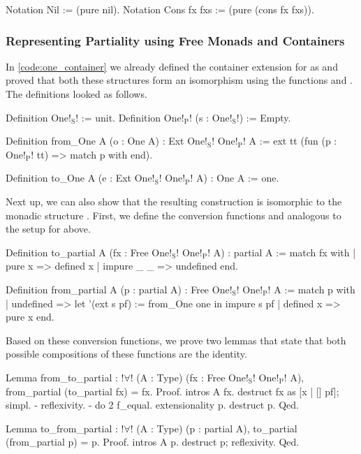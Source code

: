 \begin{coqcode}
Notation Nil := (pure nil).
Notation Cons fx fxs := (pure (cons fx fxs)).
\end{coqcode}

\subsubsection{Representing Partiality using Free Monads and Containers}
\label{subsub:partiality_container}

In \autoref{code:one_container} we already defined the container extension for  as  and proved that both these structures form an isomorphism using the functions  and .
The definitions looked as follows.

\begin{coqcode}
Definition One!$_\text{S}$! := unit.
Definition One!$_\text{P}$! (s : One!$_\text{S}$!) := Empty.

Definition from_One A (o : One A) : Ext One!$_\text{S}$! One!$_\text{P}$! A :=
  ext tt (fun (p : One!$_\text{P}$! tt) => match p with end).

Definition to_One A (e : Ext One!$_\text{S}$! One!$_\text{P}$! A) : One A :=
  one.
\end{coqcode}

Next up, we can also show that the resulting construction   is isomorphic to the monadic structure .
First, we define the conversion functions  and  analogous to the setup for  above.

\begin{coqcode}
Definition to_partial A (fx : Free One!$_\text{S}$! One!$_\text{P}$! A) : partial A :=
 match fx with
 | pure x     => defined x
 | impure _ _ => undefined
 end.

Definition from_partial A (p : partial A) : Free One!$_\text{S}$! One!$_\text{P}$! A :=
  match p with
  | undefined => let '(ext s pf) := from_One one in impure s pf
  | defined x => pure x
  end.
\end{coqcode}

Based on these conversion functions, we prove two lemmas that state that both possible compositions of these functions are the identity.

\begin{coqcode}
Lemma from_to_partial : !$\forall$! (A : Type) (fx : Free One!$_\text{S}$! One!$_\text{P}$! A),
    from_partial (to_partial fx) = fx.
Proof.
  intros A fx. destruct fx as [x | [] pf]; simpl.
  - reflexivity.
  - do 2 f_equal. extensionality p. destruct p.
Qed.

Lemma to_from_partial : !$\forall$! (A : Type) (p : partial    A),
    to_partial (from_partial p) = p.
Proof.
  intros A p. destruct p; reflexivity.
Qed.
\end{coqcode}

